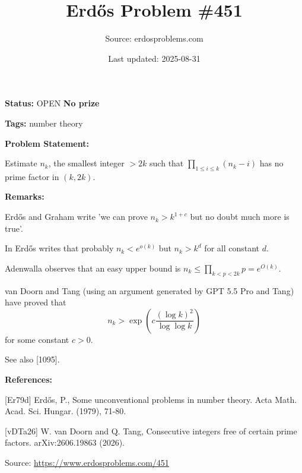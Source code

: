 \documentclass{article}
\title{Erd\H{o}s Problem \#451}
\date{Last updated: 2025-08-31}
\author{Source: erdosproblems.com}
\begin{document}
\maketitle

\noindent\textbf{Status:} OPEN \quad \textbf{No prize}

\noindent\textbf{Tags:} number theory

\medskip
\noindent\textbf{Problem Statement:}

Estimate $n_k$, the smallest integer $>2k$ such that $\prod_{1\leq i\leq k}(n_k-i)$ has no prime factor in $(k,2k)$.

\bigskip
\noindent\textbf{Remarks:}

Erd\H{o}s and Graham write 'we can prove $n_k>k^{1+c}$ but no doubt much more is true'. 

In \cite{Er79d} Erd\H{o}s writes that probably $n_k<e^{o(k)}$ but $n_k>k^d$ for all constant $d$.

Adenwalla observes that an easy upper bound is $n_k\leq \prod_{k<p<2k}p=e^{O(k)}$.

van Doorn and Tang \cite{vDTa26} (using an argument generated by GPT 5.5 Pro and Tang) have proved that\[n_k> \exp\left(c\frac{(\log k)^2}{\log\log k}\right)\]for some constant $c>0$. 

See also [1095].

\bigskip
\noindent\textbf{References:}

[Er79d] Erd\H{o}s, P., Some unconventional problems in number theory. Acta Math. Acad. Sci. Hungar. (1979), 71-80.
 
 [vDTa26] W. van Doorn and Q. Tang, Consecutive integers free of certain prime factors. arXiv:2606.19863 (2026).

\bigskip
\noindent\small{Source: \url{https://www.erdosproblems.com/451}}
\end{document}
